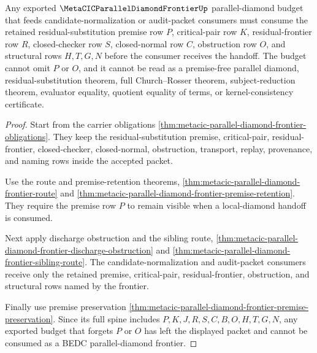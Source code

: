 \begin{theorem}\label{thm:metacic-parallel-diamond-frontier-budget}
Any exported $\MetaCICParallelDiamondFrontierUp$ parallel-diamond budget that feeds candidate-normalization or audit-packet consumers must consume the retained residual-substitution premise row $P$, critical-pair row $K$, residual-frontier row $R$, closed-checker row $S$, closed-normal row $C$, obstruction row $O$, and structural rows $H,T,G,N$ before the consumer receives the handoff. The budget cannot omit $P$ or $O$, and it cannot be read as a premise-free parallel diamond, residual-substitution theorem, full Church--Rosser theorem, subject-reduction theorem, evaluator equality, quotient equality of terms, or kernel-consistency certificate.
\end{theorem}
\begin{proof}
Start from the carrier obligations \autoref{thm:metacic-parallel-diamond-frontier-obligations}. They keep the residual-substitution premise, critical-pair, residual-frontier, closed-checker, closed-normal, obstruction, transport, replay, provenance, and naming rows inside the accepted packet.

Use the route and premise-retention theorems, \autoref{thm:metacic-parallel-diamond-frontier-route} and \autoref{thm:metacic-parallel-diamond-frontier-premise-retention}. They require the premise row $P$ to remain visible when a local-diamond handoff is consumed.

Next apply discharge obstruction and the sibling route, \autoref{thm:metacic-parallel-diamond-frontier-discharge-obstruction} and \autoref{thm:metacic-parallel-diamond-frontier-sibling-route}. The candidate-normalization and audit-packet consumers receive only the retained premise, critical-pair, residual-frontier, obstruction, and structural rows named by the frontier.

Finally use premise preservation \autoref{thm:metacic-parallel-diamond-frontier-premise-preservation}. Since its full spine includes $P,K,J,R,S,C,B,O,H,T,G,N$, any exported budget that forgets $P$ or $O$ has left the displayed packet and cannot be consumed as a BEDC parallel-diamond frontier.
\end{proof}

